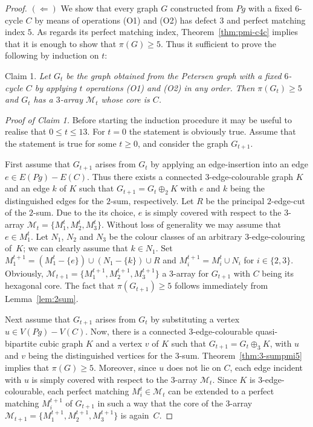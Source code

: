 \documentclass[10pt,a4paper]{amsart}
\begin{document}
\begin{proof}
$(\Leftarrow)$ We show that every graph $G$ constructed from
$Pg$ with a fixed $6$-cycle $C$ by means of operations (O1) and
(O2) has defect $3$ and perfect matching index $5$. As regards
its perfect matching index, Theorem~\ref{thm:pmi-c4c} implies
that it is enough to show that $\pi(G)\ge 5$. Thus it
sufficient to prove the following by induction on $t$:

\medskip\noindent
Claim 1. \emph{Let $G_t$ be the graph obtained from the
Petersen graph with a fixed $6$-cycle $C$ by applying $t$
operations {\rm (O1)} and {\rm (O2)} in any order. Then
$\pi(G_t)\ge 5$ and $G_t$ has a $3$-array $\mathcal{M}_t$ whose
core is $C$.}

\medskip\noindent
\emph{Proof of Claim 1.} Before starting the induction
procedure it may be useful to realise that $0\le t\le 13$. For
$t=0$ the statement is obviously true. Assume that the
statement is true for some $t\ge 0$, and consider the graph
$G_{t+1}$.

First assume that $G_{t+1}$ arises from $G_t$ by applying an
edge-insertion into an edge $e\in E(Pg)-E(C)$. Thus there
exists a connected $3$-edge-colourable graph $K$ and an edge
$k$ of $K$ such that $G_{t+1}=G_t\oplus_2 K$ with $e$ and $k$
being the distinguished edges for the $2$-sum, respectively.
Let $R$ be the principal $2$-edge-cut of the $2$-sum. Due to
the its choice, $e$ is simply covered with respect to the
$3$-array $\mathcal{M}_t=\{M_1^t,M_2^t,M_3^t\}$. Without loss
of generality we may assume that $e\in M_1^t$. Let $N_1$, $N_2$
and $N_3$ be the colour classes of an arbitrary
$3$-edge-colouring of~$K$; we can clearly assume that $k\in
N_1$. Set $M_1^{t+1}=(M_1^t-\{e\})\cup (N_1-\{k\})\cup R$ and
$M_i^{t+1}=M_i^t\cup N_i$ for $i\in\{2,3\}$. Obviously,
$\mathcal{M}_{t+1}=\{M_1^{t+1},M_2^{t+1},M_3^{t+1}\}$ a
$3$-array for $G_{t+1}$ with $C$ being its hexagonal core. The
fact that $\pi(G_{t+1})\ge 5$ follows immediately from
Lemma~\ref{lem:2sum}.

Next assume that $G_{t+1}$ arises from $G_t$ by substituting a
vertex $u\in V(Pg)-V(C)$. Now, there is a connected
$3$-edge-colourable quasi-bipartite cubic graph $K$ and a
vertex $v$ of $K$ such that $G_{t+1}=G_t\oplus_3 K$, with $u$
and $v$ being the distinguished vertices for the $3$-sum.
Theorem~\ref{thm:3-sumpmi5} implies that $\pi(G)\ge 5$.
Moreover, since $u$ does not lie on $C$, each edge incident
with $u$ is simply covered with respect to the $3$-array
$\mathcal{M}_t$. Since $K$ is $3$-edge-colourable, each perfect
matching $M_i^t\in\mathcal{M}_t$ can be extended to a perfect
matching $M_i^{t+1}$ of $G_{t+1}$ in such a way that the core
of the $3$-array
$\mathcal{M}_{t+1}=\{M_1^{t+1},M_2^{t+1},M_3^{t+1}\}$ is
again~$C$.


\end{proof}
\end{document}
